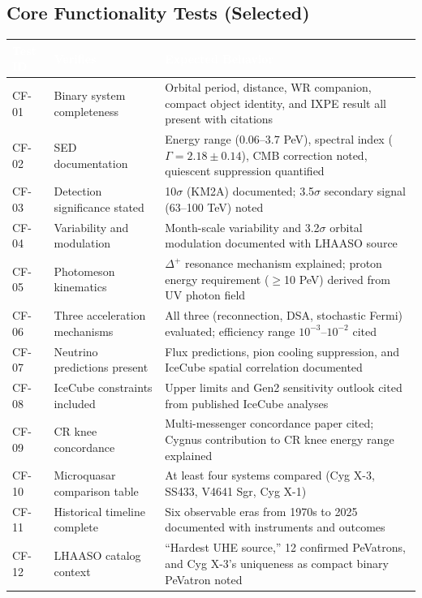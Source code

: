 \documentclass[11pt,letterpaper]{article}
\newcommand{\tableheader}[1]{\textbf{\sffamily\textcolor{white}{#1}}}
\begin{document}
\subsection{Core Functionality Tests (Selected)}

\begin{center}
\begin{tabularx}{\textwidth}{C{1.5cm}L{3.5cm}X}
\toprule
{}
\tableheader{Test ID} & \tableheader{Verifies} & \tableheader{Expected Behavior} \\
\midrule
CF-01 & Binary system completeness & Orbital period, distance, WR companion, compact object identity, and IXPE result all present with citations \\
CF-02 & SED documentation & Energy range (0.06--3.7 PeV), spectral index ($\Gamma=2.18\pm0.14$), CMB correction noted, quiescent suppression quantified \\
CF-03 & Detection significance stated & 10$\sigma$ (KM2A) documented; 3.5$\sigma$ secondary signal (63--100 TeV) noted \\
CF-04 & Variability and modulation & Month-scale variability and 3.2$\sigma$ orbital modulation documented with LHAASO source \\
CF-05 & Photomeson kinematics & $\Delta^+$ resonance mechanism explained; proton energy requirement ($\geq$10 PeV) derived from UV photon field \\
CF-06 & Three acceleration mechanisms & All three (reconnection, DSA, stochastic Fermi) evaluated; efficiency range $10^{-3}$--$10^{-2}$ cited \\
CF-07 & Neutrino predictions present & Flux predictions, pion cooling suppression, and IceCube spatial correlation documented \\
CF-08 & IceCube constraints included & Upper limits and Gen2 sensitivity outlook cited from published IceCube analyses \\
CF-09 & CR knee concordance & Multi-messenger concordance paper cited; Cygnus contribution to CR knee energy range explained \\
CF-10 & Microquasar comparison table & At least four systems compared (Cyg X-3, SS433, V4641 Sgr, Cyg X-1) \\
CF-11 & Historical timeline complete & Six observable eras from 1970s to 2025 documented with instruments and outcomes \\
CF-12 & LHAASO catalog context & ``Hardest UHE source,'' 12 confirmed PeVatrons, and Cyg X-3's uniqueness as compact binary PeVatron noted \\
\bottomrule
\end{tabularx}
\end{center}
\end{document}
